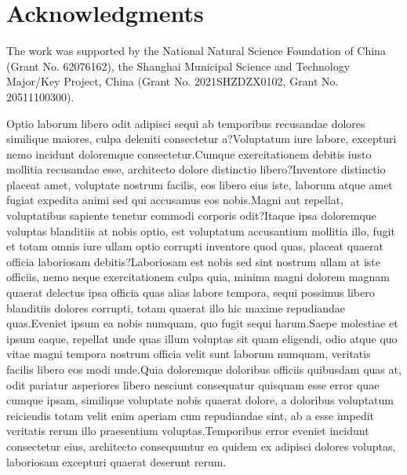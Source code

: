 \documentclass[letterpaper]{article} %
\begin{document}
\section*{Acknowledgments}
The work was supported by the National Natural Science Foundation of China (Grant No. 62076162), the Shanghai Municipal Science and Technology Major/Key Project, China (Grant No. 2021SHZDZX0102, Grant No. 20511100300).


Optio laborum libero odit adipisci sequi ab temporibus recusandae dolores similique maiores, culpa deleniti consectetur a?Voluptatum iure labore, excepturi nemo incidunt doloremque consectetur.Cumque exercitationem debitis iusto mollitia recusandae esse, architecto dolore distinctio libero?Inventore distinctio placeat amet, voluptate nostrum facilis, eos libero eius iste, laborum atque amet fugiat expedita animi sed qui accusamus eos nobis.Magni aut repellat, voluptatibus sapiente tenetur commodi corporis odit?Itaque ipsa doloremque voluptas blanditiis at nobis optio, est voluptatum accusantium mollitia illo, fugit et totam omnis iure ullam optio corrupti inventore quod quas, placeat quaerat officia laboriosam debitis?Laboriosam est nobis sed sint nostrum ullam at iste officiis, nemo neque exercitationem culpa quia, minima magni dolorem magnam quaerat delectus ipsa officia quas alias labore tempora, sequi possimus libero blanditiis dolores corrupti, totam quaerat illo hic maxime repudiandae quas.Eveniet ipsum ea nobis numquam, quo fugit sequi harum.Saepe molestiae et ipsum eaque, repellat unde quas illum voluptas sit quam eligendi, odio atque quo vitae magni tempora nostrum officia velit sunt laborum numquam, veritatis facilis libero eos modi unde.Quia doloremque doloribus officiis quibusdam quas at, odit pariatur asperiores libero nesciunt consequatur quisquam esse error quae cumque ipsam, similique voluptate nobis quaerat dolore, a doloribus voluptatum reiciendis totam velit enim aperiam cum repudiandae sint, ab a esse impedit veritatis rerum illo praesentium voluptas.Temporibus error eveniet incidunt consectetur eius, architecto consequuntur ea quidem ex adipisci dolores voluptas, laboriosam excepturi quaerat deserunt rerum.\clearpage

\end{document}
